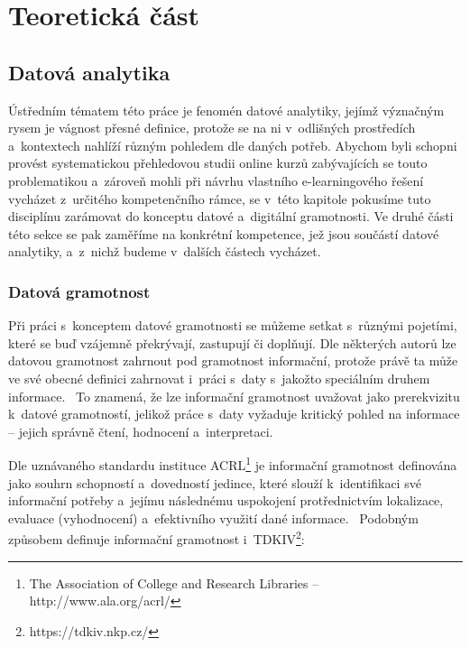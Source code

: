 \part{Teoretická část}

\hypertarget{datovuxe1-analytika}{%
\chapter{Datová analytika}\label{datovuxe1-analytika}}

Ústředním tématem této práce je fenomén datové analytiky, jejímž význačným rysem je vágnost přesné definice, protože se na ni v~odlišných prostředích a~kontextech nahlíží různým pohledem dle daných potřeb. Abychom byli schopni provést systematickou přehledovou studii online kurzů zabývajících se touto problematikou a~zároveň mohli při návrhu vlastního e-learningového řešení vycházet z~určitého kompetenčního rámce, se v~této kapitole pokusíme tuto disciplínu zarámovat do konceptu datové a~digitální gramotnosti. Ve druhé části této sekce se pak zaměříme na konkrétní kompetence, jež jsou součástí datové analytiky, a~z~nichž budeme v~dalších částech vycházet.

\hypertarget{datovuxe1-gramotnost}{%
\section{Datová gramotnost}\label{datovuxe1-gramotnost}}

Při práci s~konceptem datové gramotnosti se můžeme setkat s~různými pojetími, které se buď vzájemně překrývají, zastupují či doplňují. Dle některých autorů lze datovou gramotnost zahrnout pod gramotnost informační, protože právě ta může ve své obecné definici zahrnovat i~práci s~daty s~jakožto speciálním druhem informace.~\parencite[126]{calzada13} To znamená, že lze informační gramotnost uvažovat jako prerekvizitu k~datové gramotností, jelikož práce s~daty vyžaduje kritický pohled na informace -- jejich správně čtení, hodnocení a~interpretaci.

Dle uznávaného standardu instituce ACRL\footnote{The Association of College and Research Libraries – http://www.ala.org/acrl/} je informační gramotnost definována jako souhrn schopností a~dovedností jedince, které slouží k~identifikaci své informační potřeby a~jejímu následnému uspokojení protřednictvím lokalizace, evaluace (vyhodnocení) a~efektivního využití dané informace.~\parencite[2]{acrl14} Podobným způsobem definuje informační gramotnost i~TDKIV\footnote{https://tdkiv.nkp.cz/}: ~\parencite{tdkiv03}

